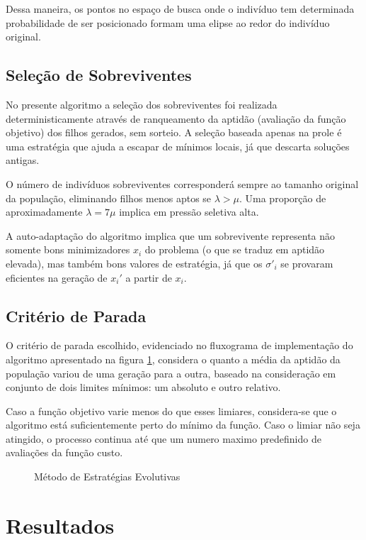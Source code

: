 \documentclass[conference,compsoc]{IEEEtran}
\begin{document}
 \vspace{0.3cm} 
Dessa maneira, os pontos no espaço de busca onde o indivíduo tem determinada probabilidade de ser posicionado formam uma elipse ao redor do indivíduo original.
 
 \subsection{Seleção de Sobreviventes}
 
 No presente algoritmo a seleção dos sobreviventes foi realizada deterministicamente através de ranqueamento da aptidão (avaliação da função objetivo) dos filhos gerados, sem sorteio. A seleção baseada apenas na prole é uma estratégia que ajuda a escapar de mínimos locais, já que descarta soluções antigas.
 
O número de indivíduos sobreviventes corresponderá sempre ao tamanho original da população, eliminando filhos menos aptos se $\lambda>\mu$. Uma proporção de aproximadamente $\lambda=7\mu$ implica em pressão seletiva alta. 

A auto-adaptação do algoritmo implica que um sobrevivente representa não somente bons minimizadores $x_i$ do problema (o que se traduz em aptidão elevada), mas também bons valores de estratégia, já que os $\sigma'_i$ se provaram eficientes na geração de $x_i'$ a partir de $x_i$.
   
\subsection{Critério de Parada}

O critério de parada escolhido, evidenciado no fluxograma de implementação do algoritmo apresentado na figura \ref{fig:ES_flow}, considera o quanto a média da aptidão da população variou de uma geração para a outra, baseado na consideração em conjunto de dois limites mínimos: um absoluto e outro relativo.

Caso a função objetivo varie menos do que esses limiares, considera-se que o algoritmo está suficientemente perto do mínimo da função. Caso o limiar não seja atingido, o processo continua até que um numero maximo predefinido de avaliações da função custo.

\begin{figure}[!hctb]
\centering
\scalebox{0.74}{}
\caption{Método de Estratégias Evolutivas}
\label{fig:ES_flow}
\end{figure}
   

\section{Resultados}
\end{document}
